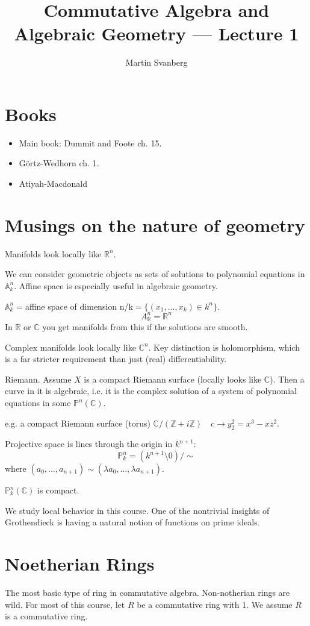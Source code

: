 \documentclass{./template}
\title{Commutative Algebra and Algebraic Geometry --- Lecture 1}
\author{Martin Svanberg}
\begin{document}
  \maketitle
  \section{Books}
  \begin{itemize}
  \item{Main book: Dummit and Foote ch. 15.}
  \item{Görtz-Wedhorn ch. 1.}
  \item{Atiyah-Macdonald}
  \end{itemize}

  \section{Musings on the nature of geometry}
  Manifolds look locally like $\mathbb R^n$.

  We can consider geometric objects as sets of solutions to polynomial equations in $\mathbb A_k^n$. Affine space is especially useful in algebraic geometry.

  $\mathbb A_k^n=$affine space of dimension n/k$=\{(x_1,\ldots,x_k)\in k^n\}$.
  $$A_{\mathbb R}^n=\mathbb R^n$$
  In $\mathbb R$ or $\mathbb C$ you get manifolds from this if the solutions are smooth.

  Complex manifolds look locally like $\mathbb C^n$. Key distinction is holomorphism, which is a far stricter requirement than just (real) differentiability.

  {\thm Riemann. Assume $X$ is a compact Riemann surface (locally looks like $\mathbb C$). Then a curve in it is algebraic, i.e. it is the complex solution of a system of polynomial equations in some $\mathbb P^n(\mathbb C)$.}

  e.g. a compact Riemann surface (torus) $\mathbb C/(\mathbb Z + i\mathbb Z)  \quad c\to y_2^2=x^3-xz^2$.

  Projective space is lines through the origin in $k^{n+1}$:
  $$\mathbb P_k^n = (k^{n+1}\setminus 0) / \sim$$
  where $(a_0,\ldots,a_{n+1}) \sim (\lambda a_0,\ldots, \lambda a_{n+1})$.

  $\mathbb P_k^n(\mathbb C)$ is compact.

  We study local behavior in this course. One of the nontrivial insights of Grothendieck is having a natural notion of functions on prime ideals.

  \section{Noetherian Rings}
  The most basic type of ring in commutative algebra. Non-notherian rings are wild. For most of this course, let $R$ be a commutative ring with 1. We assume $R$ is a commutative ring.
\end{document}
